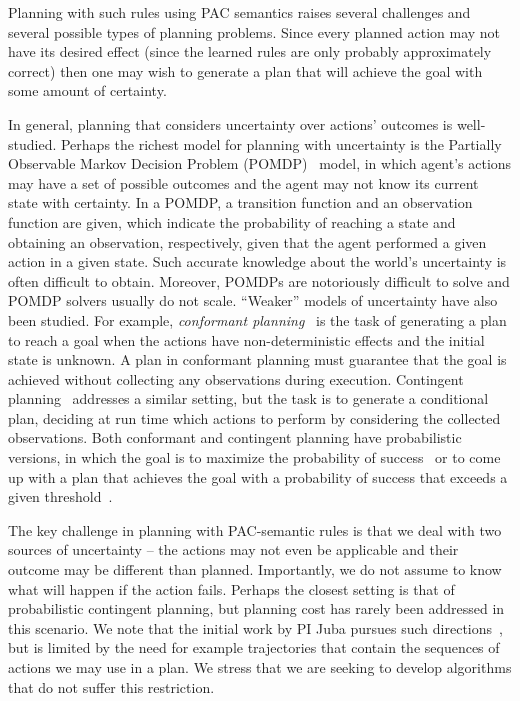 \documentclass[12pt]{article}
\newcommand{\note}[1]{\textbf{\textit{#1}}}
\begin{document}
Planning with such rules using PAC semantics raises several challenges and several possible types of planning problems.
Since every planned action may not have its desired effect (since the learned rules are only probably approximately correct)
then one may wish to generate a plan that will achieve the goal with some amount of certainty. 






In general, planning that considers uncertainty over actions' outcomes is well-studied. Perhaps the richest model for planning with uncertainty is the Partially Observable Markov Decision Problem (POMDP)~\cite{cassandra1994acting}
model, in which agent's actions may have a set of possible outcomes and the agent may not know its current state with certainty. 
In a POMDP, a transition function and an observation function are given, which indicate the probability of reaching a state and obtaining an observation, respectively, given that the agent performed a given action in a given state. Such accurate knowledge about the world's uncertainty is often difficult to obtain. Moreover, POMDPs are notoriously difficult to solve and POMDP solvers usually do not scale. %
``Weaker'' models of uncertainty have also been studied. 
For example, {\em conformant planning}~\cite{hoffmann2006conformant,cimatti2004conformant,cimatti1999conformant} is the task of generating a plan to reach a goal when the actions have non-deterministic effects
and the initial state is unknown. A plan in conformant planning must guarantee that the goal is achieved without collecting any observations during execution. Contingent planning~\cite{hoffmann2005contingent,majercik2003contingent} addresses a similar setting, but the task is to generate a conditional plan, deciding at run time which actions to perform by considering the collected observations. 
Both conformant and contingent planning have probabilistic versions,
in which the goal is to maximize the probability of success~\cite{blum1999probabilistic,taig2015compilation,markou2016cost} 
or to come up with a plan that achieves the goal with a probability of success that exceeds a given threshold~\cite{kushmerick1995algorithm}.

The key challenge in planning with PAC-semantic rules is that
we deal with two sources of uncertainty -- the actions  may not even be applicable and their outcome may be different than planned. Importantly, we do not assume to know what will happen if the action fails. Perhaps the closest setting is that of probabilistic contingent planning, but planning cost has rarely been addressed in this scenario. We note that the initial work by PI Juba pursues such directions~\cite{juba2016jmlr}, but is limited by the need for example trajectories that contain the sequences of actions we may use in a plan. We stress that we are seeking to develop algorithms that do not suffer this restriction.
\end{document}
